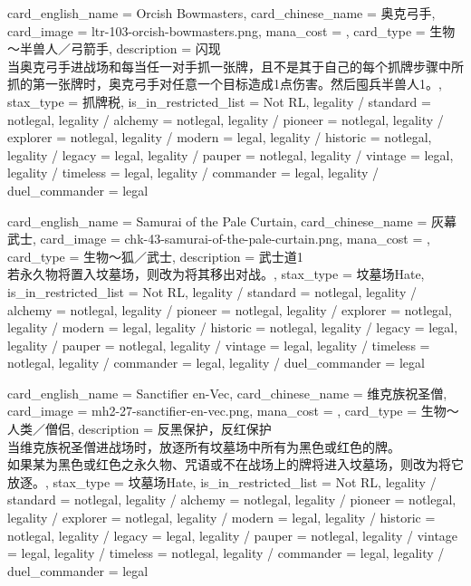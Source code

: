 \documentclass[lang = cn, color = black, 10pt]{AllThatStax}
\begin{document}
\card
{
	card_english_name = {Orcish Bowmasters},
	card_chinese_name = {奥克弓手},
	card_image = ltr-103-orcish-bowmasters.png,
	mana_cost = ,
	card_type = 生物～半兽人／弓箭手,
	description = {闪现\\
当奥克弓手进战场和每当任一对手抓一张牌，且不是其于自己的每个抓牌步骤中所抓的第一张牌时，奥克弓手对任意一个目标造成1点伤害。然后囤兵半兽人1。},
	stax_type = 抓牌税,
	is_in_restricted_list = Not RL,
	legality / standard = notlegal,
	legality / alchemy = notlegal,
	legality / pioneer = notlegal,
	legality / explorer = notlegal,
	legality / modern = legal,
	legality / historic = notlegal,
	legality / legacy = legal,
	legality / pauper = notlegal,
	legality / vintage = legal,
	legality / timeless = legal,
	legality / commander = legal,
	legality / duel_commander = legal
}

\card
{
	card_english_name = {Samurai of the Pale Curtain},
	card_chinese_name = {灰幕武士},
	card_image = chk-43-samurai-of-the-pale-curtain.png,
	mana_cost = ,
	card_type = 生物～狐／武士,
	description = {武士道1\\
若永久物将置入坟墓场，则改为将其移出对战。},
	stax_type = 坟墓场Hate,
	is_in_restricted_list = Not RL,
	legality / standard = notlegal,
	legality / alchemy = notlegal,
	legality / pioneer = notlegal,
	legality / explorer = notlegal,
	legality / modern = legal,
	legality / historic = notlegal,
	legality / legacy = legal,
	legality / pauper = notlegal,
	legality / vintage = legal,
	legality / timeless = notlegal,
	legality / commander = legal,
	legality / duel_commander = legal
}

\card
{
	card_english_name = {Sanctifier en-Vec},
	card_chinese_name = {维克族祝圣僧},
	card_image = mh2-27-sanctifier-en-vec.png,
	mana_cost = ,
	card_type = 生物～人类／僧侣,
	description = {反黑保护，反红保护\\
当维克族祝圣僧进战场时，放逐所有坟墓场中所有为黑色或红色的牌。\\
如果某为黑色或红色之永久物、咒语或不在战场上的牌将进入坟墓场，则改为将它放逐。},
	stax_type = 坟墓场Hate,
	is_in_restricted_list = Not RL,
	legality / standard = notlegal,
	legality / alchemy = notlegal,
	legality / pioneer = notlegal,
	legality / explorer = notlegal,
	legality / modern = legal,
	legality / historic = notlegal,
	legality / legacy = legal,
	legality / pauper = notlegal,
	legality / vintage = legal,
	legality / timeless = notlegal,
	legality / commander = legal,
	legality / duel_commander = legal
}
\end{document}
